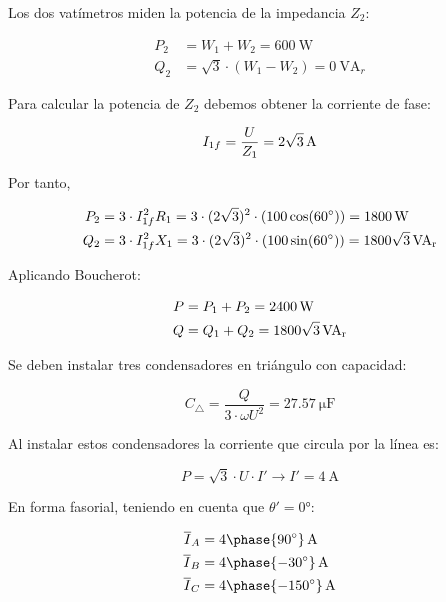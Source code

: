 \documentclass[12pt]{article}
\begin{document}
\noindent\hrulefill

Los dos vatímetros miden la potencia de la impedancia $Z_2$:

\begin{align*}
  P_2 &= W_1 + W_2 = \SI{600}{\watt}\\
  Q_2 &= \sqrt{3}\cdot (W_1 - W_2) = \SI{0}{\volt\ampere_r}
\end{align*}

Para calcular la potencia de $Z_2$ debemos obtener la corriente de fase:

\[
  I_{1f} = \frac{U}{Z_1} = \SI[parse-numbers=false]{2\sqrt{3}}{\ampere}
\]

Por tanto,

\begin{align*}
  P_2 &= 3 \cdot I_{1f}^2 R_1 = 3 \cdot (2\sqrt{3})^2 \cdot (100\cos(\ang{60})) = \SI{1800}{\watt}\\
  Q_2 &= 3 \cdot I_{1f}^2 X_1 = 3 \cdot (2\sqrt{3})^2 \cdot (100\sin(\ang{60})) = \SI[parse-numbers=false]{1800\sqrt{3}}{\volt\ampere_r}
\end{align*}

Aplicando Boucherot:

\begin{align*}
  P &= P_1 + P_2 = \SI{2400}{\watt}\\
  Q &= Q_1 + Q_2 = \SI[parse-numbers=false]{1800\sqrt{3}}{\volt\ampere_r}
\end{align*}

Se deben instalar tres condensadores en triángulo con capacidad:

\[
  C_\triangle = \frac{Q}{3 \cdot \omega U^2} = \SI{27.57}{\micro\farad}
\]

Al instalar estos condensadores la corriente que circula por la línea es:

\[
  P = \sqrt{3} \cdot U \cdot I' \rightarrow I' = \SI{4}{\ampere}
\]

En forma fasorial, teniendo en cuenta que $\theta' = \ang{0}$:

\begin{align*}
  \overline{I}_A &= \SI[parse-numbers=false]{4\phase{\ang{90}}}{\ampere}\\
  \overline{I}_B &= \SI[parse-numbers=false]{4\phase{\ang{-30}}}{\ampere}\\
  \overline{I}_C &= \SI[parse-numbers=false]{4\phase{\ang{-150}}}{\ampere}
\end{align*}

\clearpage
\end{document}
